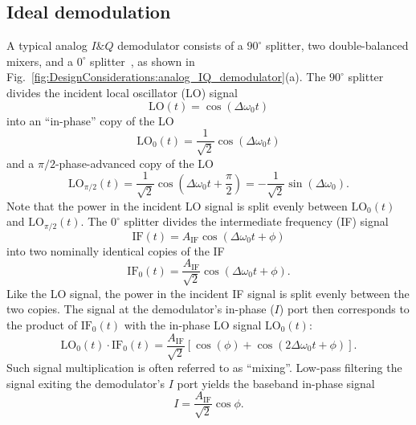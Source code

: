\subsection{Ideal demodulation}
A typical analog $I\&Q$ demodulator consists of
a $90^{\circ}$ splitter,
two double-balanced mixers, and
a $0^{\circ}$ splitter~\cite{minicircuits_modulators}, as shown in
Fig.~\ref{fig:DesignConsiderations:analog_IQ_demodulator}(a).
The $90^{\circ}$ splitter divides the incident local oscillator (LO) signal
\begin{equation}
  \text{LO}(t) = \cos(\Delta\omega_0 t)
\end{equation}
into an ``in-phase'' copy of the LO
\begin{equation}
  \text{LO}_0(t)
  =
  \frac{1}{\sqrt{2}} \cos(\Delta\omega_0 t)
\end{equation}
and a $\pi / 2$-phase-advanced copy of the LO
\begin{equation}
  \text{LO}_{\pi / 2}(t)
  =
  \frac{1}{\sqrt{2}} \cos\left( \Delta\omega_0 t + \frac{\pi}{2} \right)
  =
  - \frac{1}{\sqrt{2}} \sin(\Delta\omega_0).
\end{equation}
Note that the power in the incident LO signal
is split evenly between $\text{LO}_0(t)$ and $\text{LO}_{\pi / 2}(t)$.
The $0^{\circ}$ splitter divides the intermediate frequency (IF) signal
\begin{equation}
  \text{IF}(t) = A_{\text{IF}} \cos(\Delta\omega_0 t + \phi)
\end{equation}
into two nominally identical copies of the IF
\begin{equation}
  \text{IF}_0(t)
  =
  \frac{A_{\text{IF}}}{\sqrt{2}} \cos(\Delta\omega_0 t + \phi).
\end{equation}
Like the LO signal, the power in the incident IF signal
is split evenly between the two copies.
The signal at the demodulator's in-phase ($I$) port
then corresponds to the product of
$\text{IF}_0(t)$ with the in-phase LO signal $\text{LO}_0(t)$:
\begin{equation}
  \text{LO}_0(t) \cdot \text{IF}_0(t)
  =
  \frac{A_{\text{IF}}}{\sqrt{2}}
  \left[
    \cos(\phi) + \cos(2 \Delta\omega_0 t + \phi)
  \right].
\end{equation}
Such signal multiplication is often referred to as ``mixing''.
Low-pass filtering the signal exiting the demodulator's $I$ port
yields the baseband in-phase signal
\begin{equation}
  I = \frac{A_{\text{IF}}}{\sqrt{2}} \cos\phi.
\end{equation}
